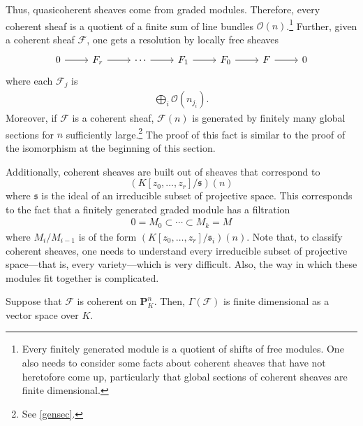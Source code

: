 \documentclass [11 pt, oneside] {article}
\begin{document}
Thus, quasicoherent sheaves come from graded modules. Therefore, every coherent sheaf is a quotient of a finite sum of line bundles $\mathscr{O}(n)$.\footnote{Every finitely generated module is a quotient of shifts of free modules. One also needs to consider some facts about coherent sheaves that have not heretofore come up, particularly that global sections of coherent sheaves are finite dimensional.} Further, given a coherent sheaf $\mathscr{F}$, one gets a resolution by locally free sheaves
\[
\begin{tikzcd}
	0\ar[r]&\mathscr{F}_r\ar[r]&\cdots\ar[r]&\mathscr{F}_1\ar[r]&\mathscr{F}_0\ar[r]&\mathscr{F}\ar[r]&0
\end{tikzcd}
\]
where each $\mathscr{F}_j$ is
\begin{align*}
	\bigoplus_{i}\mathscr{O}(n_{j_i}).
\end{align*}
Moreover, if $\mathscr{F}$ is a coherent sheaf, $\mathscr{F}(n)$ is generated by finitely many global sections for $n$ sufficiently large.\footnote{See \cref{gensec}.} The proof of this fact is similar to the proof of the isomorphism at the beginning of this section.

Additionally, coherent sheaves are built out of sheaves that correspond to 
\[
	(K[z_0,\hdots,z_r]/\mathfrak{s})(n)
\] 
where $\mathfrak{s}$ is the ideal of an irreducible subset of projective space. This corresponds to the fact that a finitely generated graded module has a filtration
\begin{align*}
	0 = M_0\subset\cdots\subset M_k=M
\end{align*}
where $M_i/M_{i-1}$ is of the form $(K[z_0,\hdots,z_r]/\mathfrak{s}_i)(n)$. Note that, to classify coherent sheaves, one needs to understand every irreducible subset of projective space---that is, every variety---which is very difficult. Also, the way in which these modules fit together is complicated.

\begin{proposition}[ ]\label{}\text{}
Suppose that $\mathscr{F}$ is coherent on $\mathbf{P}^n_K$. Then, $\Gamma(\mathscr{F})$ is finite dimensional as a vector space over $K$.
\end{proposition}
\end{document}
